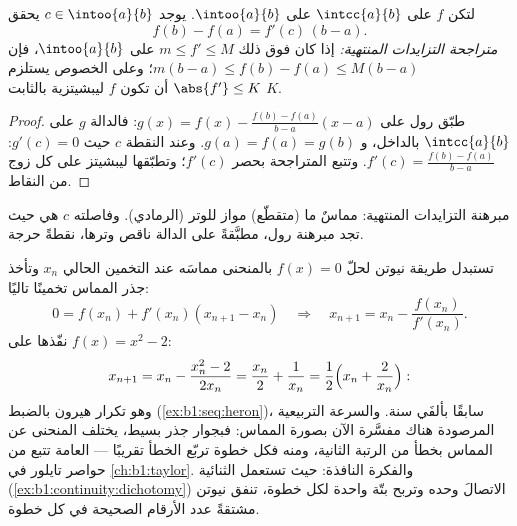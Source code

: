 \begin{theorem}\label{thm:b1:derivative:mvt}
لتكن $f$  على $\intcc{a}{b}$  على
$\intoo{a}{b}$. يوجد $c \in \intoo{a}{b}$ يحقق
\[
f(b) - f(a) = f'(c)\,(b - a) .
\]
\emph{متراجحة التزايدات المنتهية:} إذا كان فوق ذلك $m \leq f' \leq M$ على
$\intoo{a}{b}$، فإن $m(b-a) \leq f(b) - f(a) \leq M(b-a)$؛ وعلى
الخصوص يستلزم $\abs{f'} \leq K$ أن تكون $f$ ليبشيتزية بالثابت $K$.
\end{theorem}

\begin{proof}
طبّق رول على $g(x) = f(x) - \frac{f(b) - f(a)}{b - a}(x - a)$: فالدالة $g$
 على $\intcc{a}{b}$  بالداخل، و $g(a) =
f(a) = g(b)$. وعند النقطة $c$ حيث $g'(c) = 0$: $f'(c) =
\frac{f(b)-f(a)}{b-a}$. وتتبع المتراجحة بحصر $f'(c)$؛
وتطبّقها  ليبشيتز على كل زوج من النقاط.
\end{proof}

\begin{omfigure}

{\small مبرهنة التزايدات المنتهية: مماسٌ ما (متقطّع) مواز
للوتر (الرمادي). وفاصلته $c$ هي حيث تجد مبرهنة رول، مطبَّقةً
على الدالة ناقص وترها، نقطةً حرجة.}
\end{omfigure}

\begin{example}\label{ex:b1:derivative:newton}
تستبدل طريقة نيوتن لحلّ $f(x) = 0$ بالمنحنى
مماسَه عند التخمين الحالي $x_n$ وتأخذ جذر المماس
تخمينًا تاليًا:
\[
0 = f(x_n) + f'(x_n)(x_{n+1} - x_n)
\quad\Longrightarrow\quad
x_{n+1} = x_n - \frac{f(x_n)}{f'(x_n)} .
\]
نفّذها على $f(x) = x^2 - 2$:
\[
x_{n+1} = x_n - \frac{x_n^2 - 2}{2x_n}
= \frac{x_n}{2} + \frac{1}{x_n}
= \frac12\Bigl(x_n + \frac{2}{x_n}\Bigr) :
\]
وهو تكرار هيرون بالضبط (\cref{ex:b1:seq:heron})، سابقًا بألفَي
سنة. والسرعة التربيعية المرصودة هناك مفسَّرة الآن
بصورة المماس: فبجوار جذر بسيط، يختلف المنحنى عن
المماس بخطأ من الرتبة الثانية، ومنه فكل خطوة تربّع الخطأ
تقريبًا ---  العامة تتبع من حواصر تايلور في
\cref{ch:b1:taylor}. والفكرة النافذة:
حيث تستعمل الثنائية (\cref{ex:b1:continuity:dichotomy}) الاتصالَ
وحده وتربح بتّة واحدة لكل خطوة، تنفق نيوتن
مشتقةً  عدد الأرقام الصحيحة في كل خطوة.
\end{example}

